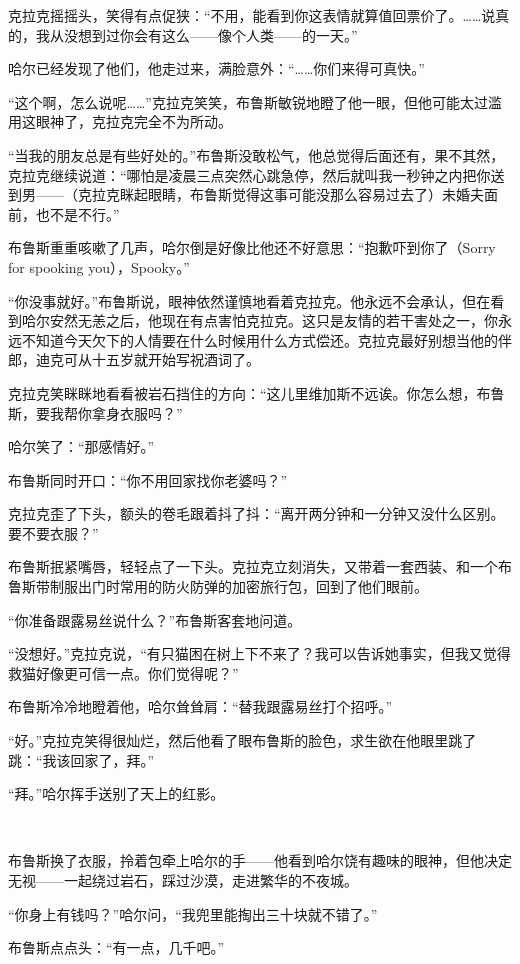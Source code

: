 \documentclass[../main]{subfiles}
\begin{document}
克拉克摇摇头，笑得有点促狭：“不用，能看到你这表情就算值回票价了。……说真的，我从没想到过你会有这么——像个人类——的一天。”

哈尔已经发现了他们，他走过来，满脸意外：“……你们来得可真快。”

“这个啊，怎么说呢……”克拉克笑笑，布鲁斯敏锐地瞪了他一眼，但他可能太过滥用这眼神了，克拉克完全不为所动。

“当我的朋友总是有些好处的。”布鲁斯没敢松气，他总觉得后面还有，果不其然，克拉克继续说道：“哪怕是凌晨三点突然心跳急停，然后就叫我一秒钟之内把你送到男——（克拉克眯起眼睛，布鲁斯觉得这事可能没那么容易过去了）未婚夫面前，也不是不行。”

布鲁斯重重咳嗽了几声，哈尔倒是好像比他还不好意思：“抱歉吓到你了（Sorry for spooking you），Spooky。”

“你没事就好。”布鲁斯说，眼神依然谨慎地看着克拉克。他永远不会承认，但在看到哈尔安然无恙之后，他现在有点害怕克拉克。这只是友情的若干害处之一，你永远不知道今天欠下的人情要在什么时候用什么方式偿还。克拉克最好别想当他的伴郎，迪克可从十五岁就开始写祝酒词了。

克拉克笑眯眯地看看被岩石挡住的方向：“这儿里维加斯不远诶。你怎么想，布鲁斯，要我帮你拿身衣服吗？”

哈尔笑了：“那感情好。”

布鲁斯同时开口：“你不用回家找你老婆吗？”

克拉克歪了下头，额头的卷毛跟着抖了抖：“离开两分钟和一分钟又没什么区别。要不要衣服？”

布鲁斯抿紧嘴唇，轻轻点了一下头。克拉克立刻消失，又带着一套西装、和一个布鲁斯带制服出门时常用的防火防弹的加密旅行包，回到了他们眼前。

“你准备跟露易丝说什么？”布鲁斯客套地问道。

“没想好。”克拉克说，“有只猫困在树上下不来了？我可以告诉她事实，但我又觉得救猫好像更可信一点。你们觉得呢？”

布鲁斯冷冷地瞪着他，哈尔耸耸肩：“替我跟露易丝打个招呼。”

“好。”克拉克笑得很灿烂，然后他看了眼布鲁斯的脸色，求生欲在他眼里跳了跳：“我该回家了，拜。”

“拜。”哈尔挥手送别了天上的红影。

~\

布鲁斯换了衣服，拎着包牵上哈尔的手——他看到哈尔饶有趣味的眼神，但他决定无视——一起绕过岩石，踩过沙漠，走进繁华的不夜城。

“你身上有钱吗？”哈尔问，“我兜里能掏出三十块就不错了。”

布鲁斯点点头：“有一点，几千吧。”
\end{document}

